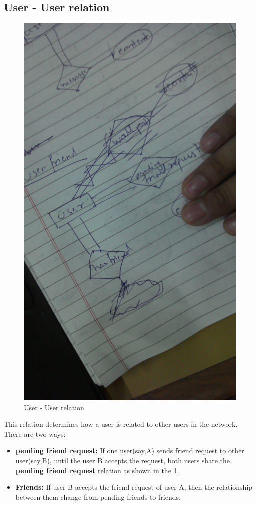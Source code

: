 \documentclass{article}
\begin{document}
\subsection{User - User relation}
\begin{figure}[h]
\centering
\includegraphics[scale=0.2]{fig1.jpg}
\caption{User - User relation}
\label{fig1}
\end{figure}
This relation determines how a user is related to other users in the network. There are two ways:
\begin{itemize}
\item \textbf{pending friend request:} If one user(say,A) sends friend request to other user(say,B), until the user B accepts the request, both users share the \textbf{pending friend request} relation as shown in the \ref{fig1}.
\item \textbf{Friends:} If user B accepts the friend request of user A, then the relationship between them change from pending friends to friends. 
\end{itemize}
\end{document}

